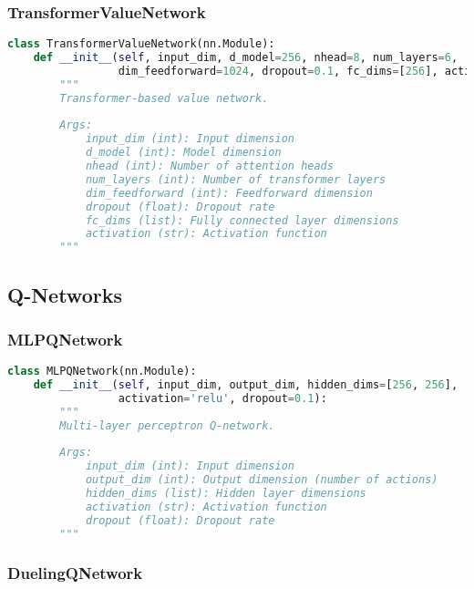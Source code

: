 \subsubsection{TransformerValueNetwork}

\begin{lstlisting}[language=python]
class TransformerValueNetwork(nn.Module):
    def __init__(self, input_dim, d_model=256, nhead=8, num_layers=6,
                 dim_feedforward=1024, dropout=0.1, fc_dims=[256], activation='relu'):
        """
        Transformer-based value network.
        
        Args:
            input_dim (int): Input dimension
            d_model (int): Model dimension
            nhead (int): Number of attention heads
            num_layers (int): Number of transformer layers
            dim_feedforward (int): Feedforward dimension
            dropout (float): Dropout rate
            fc_dims (list): Fully connected layer dimensions
            activation (str): Activation function
        """
\end{lstlisting}

\subsection{Q-Networks}

\subsubsection{MLPQNetwork}

\begin{lstlisting}[language=python]
class MLPQNetwork(nn.Module):
    def __init__(self, input_dim, output_dim, hidden_dims=[256, 256],
                 activation='relu', dropout=0.1):
        """
        Multi-layer perceptron Q-network.
        
        Args:
            input_dim (int): Input dimension
            output_dim (int): Output dimension (number of actions)
            hidden_dims (list): Hidden layer dimensions
            activation (str): Activation function
            dropout (float): Dropout rate
        """
\end{lstlisting}

\subsubsection{DuelingQNetwork}

